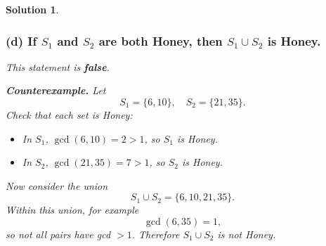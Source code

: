\documentclass[11pt]{article}
\newtheorem*{solution}{Solution}
\begin{document}
\begin{solution}
\subsubsection*{(d) If $S_1$ and $S_2$ are both Honey, then $S_1\cup S_2$ is Honey.}

This statement is \textbf{false}.

\medskip\noindent
\textbf{Counterexample.}
Let
\[
S_1 = \{6,10\},\quad S_2 = \{21,35\}.
\]
Check that each set is Honey:

\begin{itemize}
  \item In $S_1$, $\gcd(6,10) = 2 > 1$, so $S_1$ is Honey.
  \item In $S_2$, $\gcd(21,35) = 7 > 1$, so $S_2$ is Honey.
\end{itemize}

Now consider the union
\[
S_1\cup S_2 = \{6,10,21,35\}.
\]
Within this union, for example
\[
\gcd(6,35) = 1,
\]
so not all pairs have gcd $>1$. Therefore $S_1\cup S_2$ is not Honey.

\end{solution}

\end{document}

